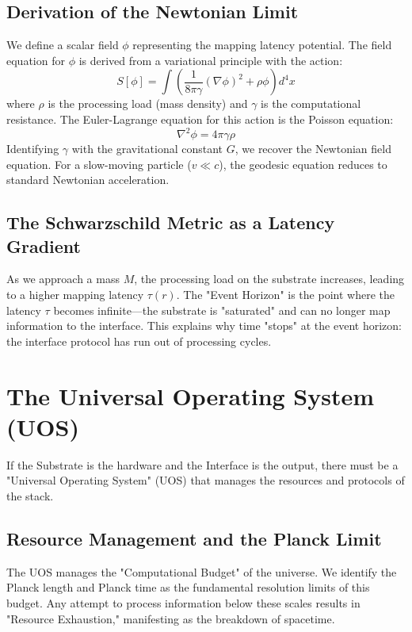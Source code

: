 \documentclass[11pt,titlepage]{article}
\begin{document}
\subsection{Derivation of the Newtonian Limit}
We define a scalar field $\phi$ representing the mapping latency potential. The field equation for $\phi$ is derived from a variational principle with the action:
\begin{equation}
S[\phi] = \int \left( \frac{1}{8\pi\gamma} (\nabla \phi)^2 + \rho \phi \right) d^4x
\end{equation}
where $\rho$ is the processing load (mass density) and $\gamma$ is the computational resistance. The Euler-Lagrange equation for this action is the Poisson equation:
\begin{equation}
\nabla^2 \phi = 4\pi \gamma \rho
\end{equation}
Identifying $\gamma$ with the gravitational constant $G$, we recover the Newtonian field equation. For a slow-moving particle ($v \ll c$), the geodesic equation reduces to standard Newtonian acceleration.

\subsection{The Schwarzschild Metric as a Latency Gradient}
As we approach a mass $M$, the processing load on the substrate increases, leading to a higher mapping latency $\tau(r)$. The "Event Horizon" is the point where the latency $\tau$ becomes infinite---the substrate is "saturated" and can no longer map information to the interface. This explains why time "stops" at the event horizon: the interface protocol has run out of processing cycles.


\section{The Universal Operating System (UOS)}
\label{sec:uos}
If the Substrate is the hardware and the Interface is the output, there must be a "Universal Operating System" (UOS) that manages the resources and protocols of the stack.

\subsection{Resource Management and the Planck Limit}
The UOS manages the "Computational Budget" of the universe. We identify the Planck length and Planck time as the fundamental resolution limits of this budget. Any attempt to process information below these scales results in "Resource Exhaustion," manifesting as the breakdown of spacetime.
\end{document}
